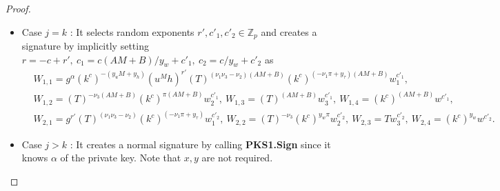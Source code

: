\documentclass[11pt,letterpaper]{article}
\newcommand{\Z}{\mathbb{Z}}
\begin{document}
\begin{proof}
\begin{itemize}
\item {Case $j = k$} : It selects random exponents $r', c'_1, c'_2 \in
    \Z_p$ and creates a signature by implicitly setting $r = -c + r',~
    c_1 = c(AM+B)/y_w + c'_1,~ c_2 = c/y_w + c'_2$ as
    \begin{align*}
    &   W_{1,1} = g^{\alpha} (k^c)^{-(y_u M + y_h)} (u^M h)^{r'}
                  (T)^{(\nu_1 \nu_3 - \nu_2)(AM+B)}
                  (k^c)^{(-\nu_1 \pi + y_{\tau})(AM+B)} w_1^{c'_1},~ \\
    &   W_{1,2} = (T)^{-\nu_3 (AM+B)} (k^c)^{\pi (AM+B)} w_2^{c'_1},~
        W_{1,3} = (T)^{(AM+B)} w_3^{c'_1},~
        W_{1,4} = (k^c)^{(AM+B)} w^{c'_1},~\\
    &   W_{2,1} = g^{r'} (T)^{(\nu_1 \nu_3 - \nu_2)}
                  (k^c)^{(-\nu_1 \pi + y_{\tau})} w_1^{c'_2},~
        W_{2,2} = (T)^{-\nu_3} (k^c)^{y_w \pi} w_2^{c'_2},~
        W_{2,3} = T w_3^{c'_2},~
        W_{2,4} = (k^c)^{y_w} w^{c'_2}.
    \end{align*}

\item {Case $j > k$} : It creates a normal signature by calling
    \textbf{PKS1.Sign} since it knows $\alpha$ of the private key. Note
    that $x, y$ are not required.
\end{itemize}


\end{proof}
\end{document}
